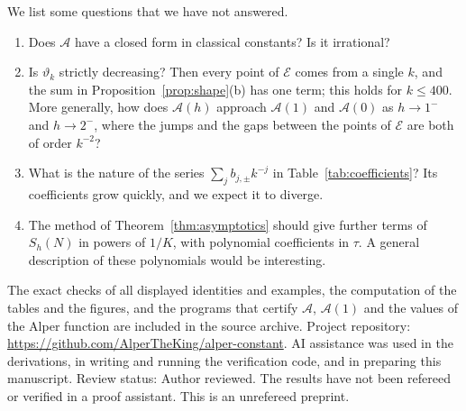 \documentclass[11pt]{article}
\theoremstyle{definition}
\theoremstyle{remark}
\newcommand{\Alp}{\mathcal{A}}
\begin{document}
We list some questions that we have not answered.
\begin{enumerate}
\item Does $\Alp$ have a closed form in classical constants? Is it
irrational?
\item Is $\vartheta_k$ strictly decreasing? Then every point of
$\mathcal E$ comes from a single $k$, and the sum in
Proposition~\ref{prop:shape}(b) has one term; this holds for $k\le400$.
More generally, how does $\Alp(h)$ approach $\Alp(1)$ and $\Alp(0)$ as
$h\to1^-$ and $h\to2^-$, where the jumps and the gaps between the
points of $\mathcal E$ are both of order $k^{-2}$?
\item What is the nature of the series $\sum_jb_{j,\pm}k^{-j}$ in
Table~\ref{tab:coefficients}? Its coefficients grow quickly, and we
expect it to diverge.
\item The method of Theorem~\ref{thm:asymptotics} should give further
terms of $S_h(N)$ in powers of $1/K$, with polynomial coefficients in
$\tau$. A general description of these polynomials would be
interesting.
\end{enumerate}

The exact checks of all displayed identities and examples, the
computation of the tables and the figures, and the programs that certify
$\Alp$, $\Alp(1)$ and the values of the Alper function are included in
the source archive. Project repository:
\url{https://github.com/AlperTheKing/alper-constant}. AI assistance was
used in the derivations, in writing and running the verification code,
and in preparing this manuscript. Review status: Author reviewed.
The results have not been refereed or
verified in a proof assistant. This is an unrefereed preprint.
\end{document}
